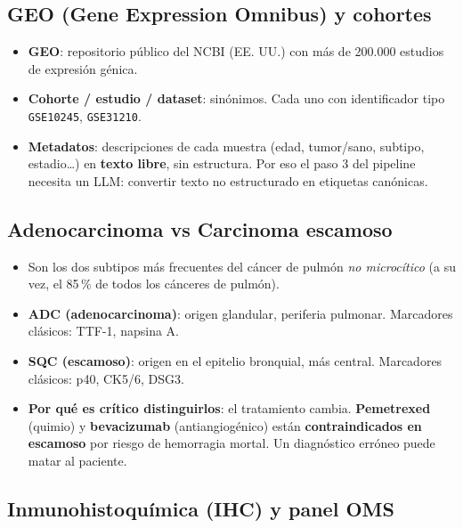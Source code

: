 \documentclass[11pt, a4paper]{article}
\begin{document}
\subsection{GEO (Gene Expression Omnibus) y cohortes}

\begin{itemize}[leftmargin=1.2em, itemsep=2pt]
  \item \textbf{GEO}: repositorio p\'ublico del NCBI (EE. UU.) con m\'as de 200.000 estudios de expresi\'on g\'enica.
  \item \textbf{Cohorte / estudio / dataset}: sin\'onimos. Cada uno con identificador tipo \texttt{GSE10245}, \texttt{GSE31210}.
  \item \textbf{Metadatos}: descripciones de cada muestra (edad, tumor/sano, subtipo, estadio\ldots) en \textbf{texto libre}, sin estructura. Por eso el paso 3 del pipeline necesita un LLM: convertir texto no estructurado en etiquetas can\'onicas.
\end{itemize}

\subsection{Adenocarcinoma vs Carcinoma escamoso}

\begin{itemize}[leftmargin=1.2em, itemsep=2pt]
  \item Son los dos subtipos m\'as frecuentes del c\'ancer de pulm\'on \emph{no microc\'itico} (a su vez, el 85\,\% de todos los c\'anceres de pulm\'on).
  \item \textbf{ADC (adenocarcinoma)}: origen glandular, periferia pulmonar. Marcadores cl\'asicos: TTF-1, napsina A.
  \item \textbf{SQC (escamoso)}: origen en el epitelio bronquial, m\'as central. Marcadores cl\'asicos: p40, CK5/6, DSG3.
  \item \textbf{Por qu\'e es cr\'itico distinguirlos}: el tratamiento cambia. \textbf{Pemetrexed} (quimio) y \textbf{bevacizumab} (antiangiog\'enico) est\'an \textbf{contraindicados en escamoso} por riesgo de hemorragia mortal. Un diagn\'ostico err\'oneo puede matar al paciente.
\end{itemize}

\subsection{Inmunohistoqu\'imica (IHC) y panel OMS}
\end{document}
